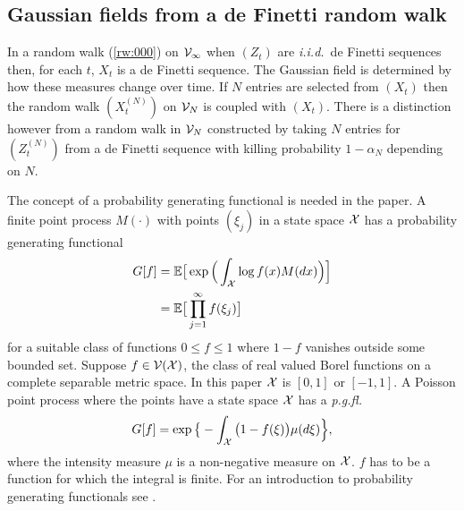 \documentclass[preprint,11pt]{elsarticle}
\theoremstyle{remark}
\def\pgfl{\emph{p.g.fl.~}}
\def\iid{\emph{i.i.d.}~}
\begin{document}
{\subsection{Gaussian fields from a de Finetti random walk}\label{deF:sec}
In a random walk (\ref{rw:000}) on ${\cal V}_\infty$ when $(Z_t)$ are \iid  de Finetti sequences then, for each $t$, $X_t$ is a de Finetti sequence. The Gaussian field is determined by how these measures change over time. If $N$ entries are selected from $(X_t)$ then the random walk $(X_t^{(N)})$ on ${\cal V}_N$ is coupled with $(X_t)$. There is a distinction however from a random walk in ${\cal V}_N$ constructed by taking $N$ entries for $(Z_t^{(N)})$ from a de Finetti sequence with killing probability $1-\alpha_N$ depending on $N$.

The concept of a probability generating functional is needed in the paper.
A finite point process $M(\cdot)$ with points $(\xi_j)$ in a state space ${\cal X}$  has a probability generating functional
\begin{align*}
G[f] &= \mathbb{E}\big [\exp\Big (\int_{\cal X}\log f(x) M(dx) \Big )\Big ]\\
&= \mathbb{E}\big [\prod_{j=1}^\infty f(\xi_j)\big ]
\end{align*}
for a suitable class of functions $0 \leq f \leq 1$ where $1-f$ vanishes outside some bounded set. Suppose $f \in {\cal V(X)}$, the class of real valued Borel functions on a complete separable metric space. In this paper ${\cal X}$ is $[0,1]$ or $[-1,1]$.
A Poisson point process where the points have a state space ${\cal X}$ has a \pgfl 
\[
G[f]= \exp \big \{- \int_{\cal X} \big (1-f(\xi)\big )\mu(d\xi)\Big \},
\]
where the intensity measure $\mu$ is a non-negative measure on ${\cal X}$. $f$ has to be a function for which the integral is finite.  For an introduction to probability generating functionals see \cite{W1972, DVJ2008}. 

}
\end{document}
